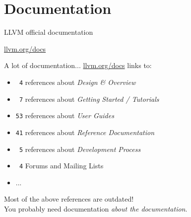 
\section{Documentation}
\begin{frame}[t]{LLVM official documentation}
  \begin{center}
    \begin{Huge}
      \vfill
      \href{http://llvm.org/docs}{llvm.org/docs}
      \vfill
    \end{Huge}
  \end{center}
\end{frame}


\begin{frame}[t]{A lot of documentation...}
\vfill
  \href{http://llvm.org/docs}{llvm.org/docs} links to:
  \begin{itemize}
    \item \texttt{\ 4} references about \textit{Design \& Overview}
    \item \texttt{\ 7} references about \textit{Getting Started / Tutorials}
    \item \texttt{53} references about \textit{User Guides}
    \item \texttt{41} references about \textit{Reference Documentation}
    \item \texttt{\ 5} references about \textit{Development Process}
    \item \texttt{\ 4} Forums and Mailing Lists
    \item ...
  \end{itemize}
  \bigskip
  Most of the above references are \alert{outdated}!\\
  \medskip
  You probably need documentation \emph{about the documentation}.
\vfill
\end{frame}


